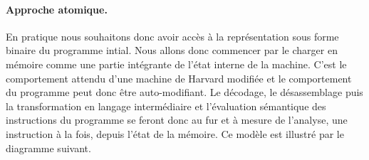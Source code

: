 


\paragraph{Approche atomique.}
En pratique nous souhaitons donc avoir accès à la représentation sous forme binaire du programme intial.
Nous allons donc commencer par le charger en mémoire comme une partie intégrante de l'état interne de la machine.
C'est le comportement attendu d'une machine de Harvard modifiée  et le comportement du programme peut donc être auto-modifiant. Le décodage, le désassemblage puis la transformation en langage intermédiaire et l'évaluation sémantique des instructions du programme se feront donc au fur et à mesure de l'analyse, une instruction à la fois, depuis l'état de la mémoire.
Ce modèle est illustré par le diagramme suivant.

